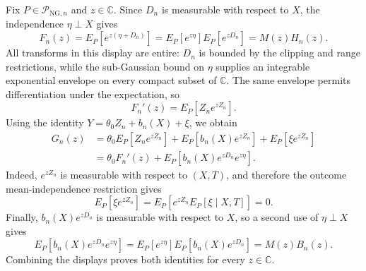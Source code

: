 Fix \(P\in\mathcal P_{\mathrm{NG},n}\) and \(z\in\mathbb C\).  Since \(D_n\) is measurable with respect to \(X\), the independence \(\eta\perp X\) gives
\[
 F_n(z)
 =E_P[e^{z(\eta+D_n)}]
 =E_P[e^{z\eta}]E_P[e^{zD_n}]
 =M(z)H_n(z).
\]
All transforms in this display are entire: \(D_n\) is bounded by the clipping and range restrictions, while the sub-Gaussian bound on \(\eta\) supplies an integrable exponential envelope on every compact subset of \(\mathbb C\).  The same envelope permits differentiation under the expectation, so
\[
 F_n'(z)=E_P[Z_ne^{zZ_n}].
\]
Using the identity \(Y=\theta_0Z_n+b_n(X)+\xi\), we obtain
\[
 \begin{aligned}
 G_n(z)
 &=\theta_0E_P[Z_ne^{zZ_n}]
   +E_P[b_n(X)e^{zZ_n}]
   +E_P[\xi e^{zZ_n}]\\
 &=\theta_0F_n'(z)
   +E_P[b_n(X)e^{zD_n}e^{z\eta}].
 \end{aligned}
\]
Indeed, \(e^{zZ_n}\) is measurable with respect to \((X,T)\), and therefore the outcome mean-independence restriction gives
\[
 E_P[\xi e^{zZ_n}]
 =E_P\!\left[e^{zZ_n}E_P[\xi\mid X,T]\right]=0.
\]
Finally, \(b_n(X)e^{zD_n}\) is measurable with respect to \(X\), so a second use of \(\eta\perp X\) gives
\[
 E_P[b_n(X)e^{zD_n}e^{z\eta}]
 =E_P[e^{z\eta}]E_P[b_n(X)e^{zD_n}]
 =M(z)B_n(z).
\]
Combining the displays proves both identities for every \(z\in\mathbb C\).